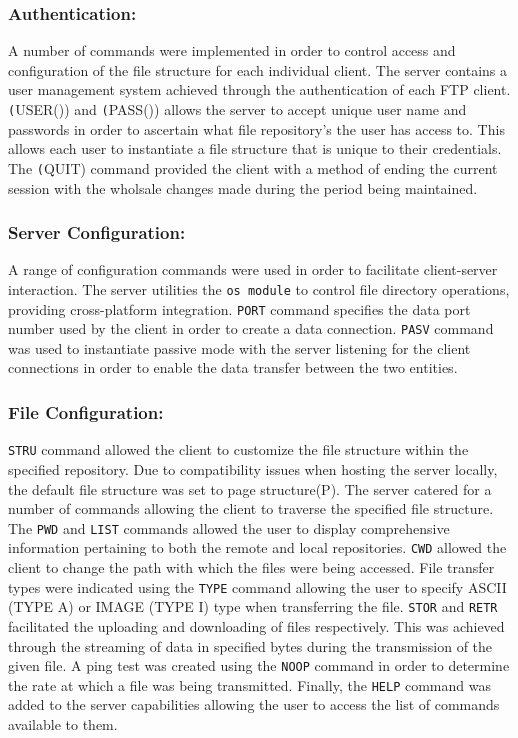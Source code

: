 \documentclass[10pt,twocolumn]{witseiepaper}
\begin{document}
\subsubsection*{Authentication:}
A number of commands were implemented in order to control access and configuration of the file structure for each individual client. The server contains a user management system achieved through the authentication of each FTP client. \texttt(USER()) and \texttt(PASS()) allows the server to accept unique user name and passwords in order to ascertain what file repository's the user has access to. This allows each user to instantiate a file structure that is unique to their credentials. The \texttt(QUIT) command provided the client with a method of ending the current session with the wholsale changes made during the period being maintained.

\subsubsection*{Server Configuration:}

A range of configuration commands were used in order to facilitate client-server interaction. The server utilities the \texttt{os module} to control file directory operations, providing cross-platform integration\cite{os}. \texttt{PORT} command specifies the data port number used by the client in order to create a data connection. \texttt{PASV} command was used to instantiate passive mode with the server listening for the client connections in order to enable the data transfer between the two entities.

\subsubsection*{File Configuration:}

\texttt{STRU} command allowed the client to customize the file structure within the specified repository. Due to compatibility issues when hosting the server locally, the default file structure was set to page structure(P). The server catered for a number of commands allowing the client to traverse the specified file structure. The \texttt{PWD} and \texttt{LIST} commands allowed the user to display comprehensive information pertaining to both the remote and local repositories. \texttt{CWD} allowed the client to change the path with which the files were being accessed. File transfer types were indicated using the \texttt{TYPE} command allowing the user to specify ASCII (TYPE A) or IMAGE (TYPE I) type when transferring the file. \texttt{STOR} and \texttt{RETR} facilitated the uploading and downloading of files respectively. This was achieved through the streaming of data in specified bytes during the transmission of the given file. A ping test was created using the \texttt{NOOP} command in order to determine the rate at which a file was being transmitted. Finally, the \texttt{HELP} command was added to the server capabilities allowing the user to access the list of commands available to them.
\end{document}
